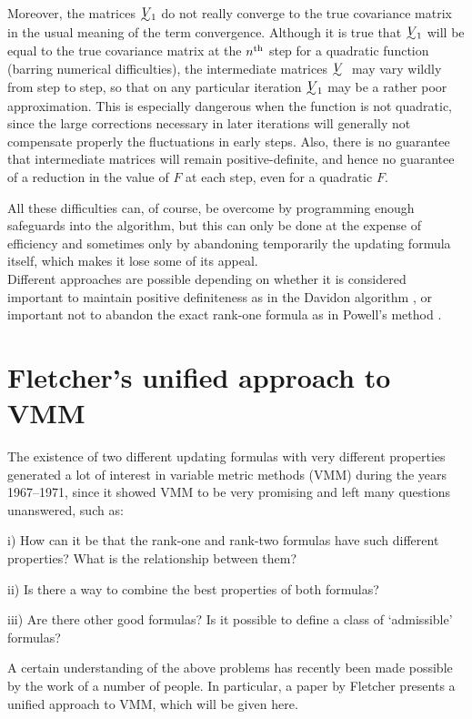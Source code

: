      Moreover, the matrices $\UTV\!\!_1$ do not really converge to the true covariance matrix 
in the usual meaning of the term convergence.  Although
it is true that $\UTV\!\!_1$ will be equal to the true covariance matrix at the
$n^{\rm th}$ step for a quadratic function (barring numerical difficulties), the
intermediate matrices $\UTV$ may vary wildly from step to step, so that on
any particular iteration $\UTV\!\!_1$ may be a rather poor approximation.  This is
especially dangerous when the function is not quadratic, since the large
corrections necessary in later iterations will generally not compensate
properly the fluctuations in early steps.  Also, there is no guarantee
that intermediate matrices will remain positive-definite, and hence no
guarantee of a reduction in the value of $F$ at each step, even for a
quadratic $F$.
 
     All these difficulties can, of course, be overcome by programming
enough safeguards into the algorithm, but this can only be done at the
expense of efficiency and sometimes only by abandoning temporarily the
updating formula itself, which makes it lose some of its appeal.\\ \noindent
Different approaches are possible depending on whether it is considered
important to maintain positive definiteness as in the Davidon
algorithm \cite{Davi}, or important not to abandon the exact rank-one formula
as in Powell's method \cite{Powe2}.
 
 
\section{Fletcher's unified approach to VMM}
 
     The existence of two different updating formulas with very different
properties generated a lot of interest in variable metric methods (VMM)
during the years 1967--1971, since it showed VMM to be very promising
and left many questions unanswered, such as:
 
  i) How can it be that the rank-one and rank-two formulas have such
     different properties?  What is the relationship between them?
 
 ii) Is there a way to combine the best properties of both formulas?
 
iii) Are there other good formulas?  Is it possible to define a class
     of `admissible' formulas?
 
     A certain understanding of the above problems has recently been
made possible by the work of a number of people. In particular, a 
paper by Fletcher \cite{Flet2} presents a unified approach to VMM, which will be
given here.
 
